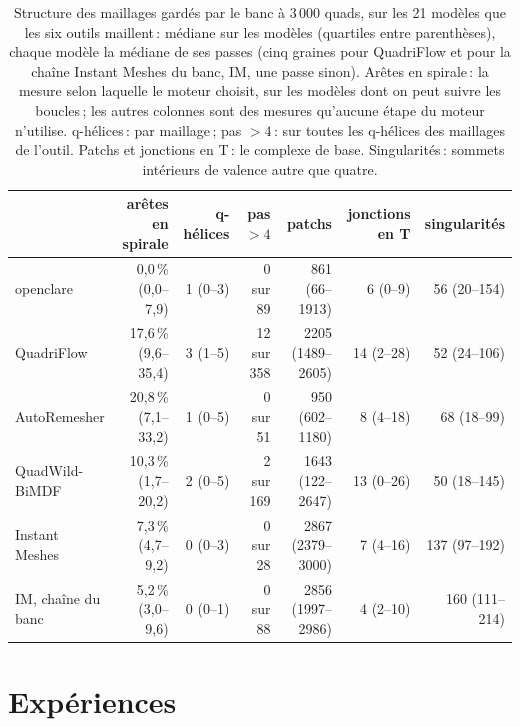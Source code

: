 \documentclass[11pt,a4paper]{article}
\begin{document}
\begin{table}[t]
\centering
\footnotesize
\setlength{\tabcolsep}{3pt}
\begin{tabular}{lrrrrrr}
\toprule
& arêtes en spirale & q-hélices & pas $> 4$ & patchs & jonctions en T & singularités \\
\midrule
openclare & 0,0\,\% (0,0--7,9) & 1 (0--3) & 0 sur 89 & 861 (66--1913) & 6 (0--9) & 56 (20--154) \\
QuadriFlow & 17,6\,\% (9,6--35,4) & 3 (1--5) & 12 sur 358 & 2205 (1489--2605) & 14 (2--28) & 52 (24--106) \\
AutoRemesher & 20,8\,\% (7,1--33,2) & 1 (0--5) & 0 sur 51 & 950 (602--1180) & 8 (4--18) & 68 (18--99) \\
QuadWild-BiMDF & 10,3\,\% (1,7--20,2) & 2 (0--5) & 2 sur 169 & 1643 (122--2647) & 13 (0--26) & 50 (18--145) \\
Instant Meshes & 7,3\,\% (4,7--9,2) & 0 (0--3) & 0 sur 28 & 2867 (2379--3000) & 7 (4--16) & 137 (97--192) \\
IM, chaîne du banc & 5,2\,\% (3,0--9,6) & 0 (0--1) & 0 sur 88 & 2856 (1997--2986) & 4 (2--10) & 160 (111--214) \\
\bottomrule
\end{tabular}
\caption{Structure des maillages gardés par le banc à 3\,000 quads, sur les
21 modèles que les six outils maillent\,: médiane sur les modèles (quartiles
entre parenthèses), chaque modèle la médiane de ses passes (cinq graines pour
QuadriFlow et pour la chaîne Instant Meshes du banc, IM, une passe sinon).
Arêtes en spirale\,: la mesure selon laquelle le moteur choisit, sur les
modèles dont on peut suivre les boucles\,; les autres colonnes sont des
mesures qu'aucune étape du moteur n'utilise. q-hélices\,: par maillage\,; pas
$> 4$\,: sur toutes les q-hélices des maillages de l'outil. Patchs et
jonctions en T\,: le complexe de base. Singularités\,: sommets intérieurs de
valence autre que quatre.}
\label{tab:structure}
\end{table}

\section{Expériences}\label{sec:experiments}
\end{document}
